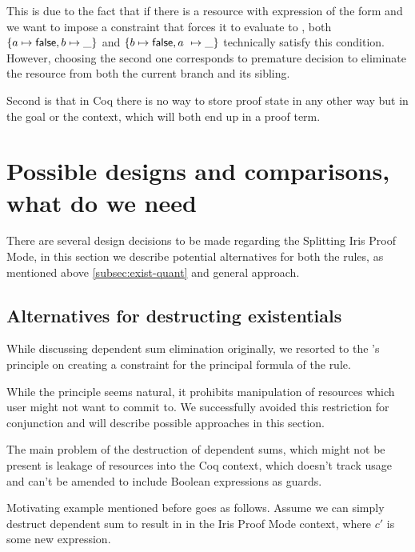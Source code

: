 This is due to the fact that if there is a resource with expression of the form  and we want to impose a constraint that forces it to evaluate to \false, both \(\left\{a \mapsto \textsf{false}, b \mapsto \_\right\} \) and \(\left\{b \mapsto \textsf{false}, a\ \mapsto \_\right\}\) technically satisfy this condition.
However, choosing the second one corresponds to premature decision to eliminate the resource from both the current branch and its sibling.

Second is that in Coq there is no way to store proof state in any other way but in the goal or the context, which will both end up in a proof term.

\section{Possible designs and comparisons, what do we need}
\label{sec:poss-designs-comp}

There are several design decisions to be made regarding the Splitting Iris Proof Mode, in this section we describe potential alternatives for both the rules, as mentioned above \ref{subsec:exist-quant} and general approach.

\subsection{Alternatives for destructing existentials}
\label{subsec:design_decisions_existential}

While discussing dependent sum elimination originally, we resorted to the \citeauthor{harlandResourceDistributionBooleanConstraints2003}'s principle on creating a constraint for the principal formula of the rule.

While the principle seems natural, it prohibits manipulation of resources which user might not want to commit to.
We successfully avoided this restriction for conjunction and will describe possible approaches in this section.

The main problem of the destruction of dependent sums, which might not be present is leakage of resources into the Coq context, which doesn't track usage and can't be amended to include Boolean expressions as guards.

Motivating example mentioned before goes as follows.
Assume we can simply destruct dependent sum  to result in  in the Iris Proof Mode context, where \(c'\) is some new expression.

